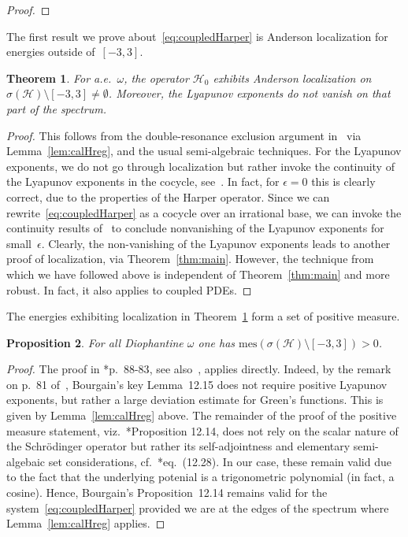 \documentclass[11pt]{amsart}
\newtheorem{theorem}{Theorem}[section]
\newtheorem{proposition}[theorem]{Proposition}
\def\mes{\mathrm{mes}}
\def\calH{\mathcal{H}}
\begin{document}
\begin{proof}
\end{proof}



The first result we prove about~\eqref{eq:coupledHarper} is Anderson localization for energies outside of~$[-3,3]$. 


\begin{theorem}
    \label{thm:couplHarper} 
     For a.e.~$\omega$, the operator $\calH_0$ exhibits Anderson localization on   $\sigma(\calH)\setminus[-3,3]\neq\emptyset$.
     Moreover, the Lyapunov exponents do not vanish on that part of the spectrum. 
\end{theorem}
\begin{proof}
    This follows from the  double-resonance exclusion argument in~\cite{BG} via Lemma~\ref{lem:calHreg}, and the usual semi-algebraic techniques. For the Lyapunov exponents, we do not go through localization but rather invoke the continuity of the Lyapunov exponents in the cocycle, see~\cite{AJS}. In fact, for $\epsilon=0$ this is clearly correct, due to the properties of the Harper operator. Since we can rewrite~\eqref{eq:coupledHarper} as a cocycle over an irrational base, we can invoke the continuity results of~\cite{AJS} to conclude nonvanishing of the Lyapunov exponents for small~$\epsilon$. Clearly, the non-vanishing of the Lyapunov exponents leads to another proof of localization, via Theorem~\ref{thm:main}. However, the technique from~\cite{BGS} which we have followed above is independent of Theorem~\ref{thm:main} and more robust. In fact, it also applies to coupled PDEs.  
 \end{proof}

The energies exhibiting localization in Theorem~\ref{thm:couplHarper} form a set of positive measure. 

\begin{proposition}\label{prop:posmeas}
    For all Diophantine $\omega$ one has  $\mes(\sigma(\calH)\setminus[-3,3])>0$. 
\end{proposition}
    \begin{proof}
 The proof in \cite{B}*{p.~88-83}, see also~\cite{B0}, applies directly. Indeed, by the remark on p.~81 of~\cite{B}, Bourgain's key Lemma~12.15 does not require positive Lyapunov exponents, but rather a large deviation estimate for Green's functions. This is given by Lemma~\ref{lem:calHreg} above. The remainder of the proof of the positive measure statement, viz.~\cite{B}*{Proposition 12.14}, does not rely on the scalar nature of the Schr\"odinger operator but rather its self-adjointness and elementary semi-algebaic set considerations, cf.~\cite{B}*{eq.\ (12.28)}. In our case, these remain valid due to the fact that the underlying potenial is a trigonometric polynomial (in fact, a cosine). Hence, Bourgain's Proposition~12.14 remains valid for the system~\eqref{eq:coupledHarper} provided we are at the edges of the spectrum where Lemma~\ref{lem:calHreg} applies.  
    \end{proof}
\end{document}
